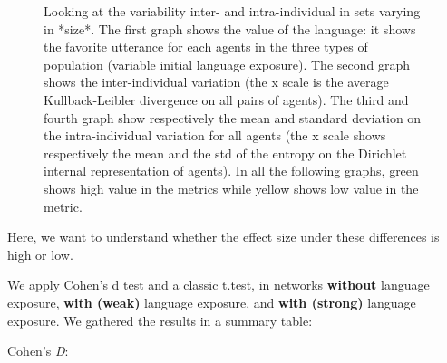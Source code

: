\documentclass[
]{article}
\begin{document}
\begin{figure}[!H]
\caption{Looking at the variability inter- and intra-individual in sets varying in *size*. The first graph shows the value of the language: it shows the favorite utterance for each agents in the three types of population (variable initial language exposure). The second graph shows the  inter-individual variation (the x scale is the average Kullback-Leibler divergence on all pairs of agents). The third and fourth graph show respectively the mean and standard deviation on the intra-individual variation for all agents (the x scale shows respectively the mean and the std of the entropy on the Dirichlet internal representation of agents). In all the following graphs, green shows high value in the metrics while yellow shows low value in the metric.}\label{fig:unnamed-chunk-18}
\end{figure}

Here, we want to understand whether the effect size under these
differences is high or low.

We apply Cohen's d test and a classic t.test, in networks
\textbf{without} language exposure, \textbf{with (weak)} language
exposure, and \textbf{with (strong)} language exposure. We gathered the
results in a summary table:

Cohen's \emph{D}:
\end{document}
